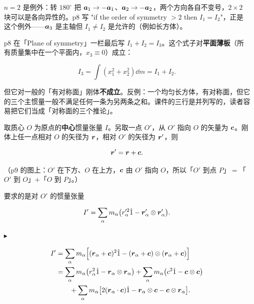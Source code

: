 \documentclass[11pt]{ctexart}
\newcommand{\step}[1]{\par\vspace{3pt}\noindent
  {\color{violet}\small$\blacktriangleright$}\hspace{3pt}{\bfseries\color{violetdeep}#1}\par\vspace{1pt}}
\begin{document}
$n=2$ 是例外：转 $180^\circ$ 把 $\boldsymbol{a}_1\to-\boldsymbol{a}_1$、$\boldsymbol{a}_2\to-\boldsymbol{a}_2$，两个方向各自不变号，$2\times2$ 块可以是各向异性的。p8 写 "if the order of symmetry $>2$ then $I_1=I_2$"，正是这个例外——$\boldsymbol{a}_3$ 是主轴但 $I_1\neq I_2$ 是允许的（例如长方体）。


p8 在「Plane of symmetry」一栏最后写 $I_1+I_2=I_3$。这个式子对\textbf{平面薄板}（所有质量集中在一个平面内，$x_3\equiv0$）成立：

\[
I_3=\int(x_1^2+x_2^2)\dd m=I_1+I_2 .
\]

但它对一般的「有对称面」刚体\textbf{不成立}。反例：一个均匀长方体，有对称面，但它的三个主惯量一般不满足任何一条为另两条之和。课件的三行是并列写的，读者容易把它们当成「对称面的三个推论」。




取质心 $O$ 为原点的\textbf{中心}惯量张量 $I$。另取一点 $O'$，从 $O'$ 指向 $O$ 的矢量为 $\boldsymbol{c}$。刚体上任一点相对 $O$ 的矢径为 $\boldsymbol{r}$，相对 $O'$ 的矢径为 $\boldsymbol{r}'$，则

\[
\boldsymbol{r}'=\boldsymbol{r}+\boldsymbol{c} .
\]

（p9 的图上：$O'$ 在下方、$O$ 在上方，$\boldsymbol{c}$ 由 $O'$ 指向 $O$，所以「$O'$ 到点 $P$」$=$「$O'$ 到 $O$」$+$「$O$ 到 $P$」。）

要求的是对 $O'$ 的惯量张量

\[
I'=\sum_\alpha m_\alpha\bigl(r_\alpha'^2\hat1-\boldsymbol{r}_\alpha'\otimes\boldsymbol{r}_\alpha'\bigr).
\]


\step{第一步：把 $\vect r'=\vect r+\vect c$ 代进去，逐项展开}
\[
\begin{aligned}
I'&=\sum_\alpha m_\alpha\Bigl[(\boldsymbol{r}_\alpha+\boldsymbol{c})^2\hat1-(\boldsymbol{r}_\alpha+\boldsymbol{c})\otimes(\boldsymbol{r}_\alpha+\boldsymbol{c})\Bigr]\\
&=\sum_\alpha m_\alpha\bigl(r_\alpha^2\hat1-\boldsymbol{r}_\alpha\otimes\boldsymbol{r}_\alpha\bigr)
+\sum_\alpha m_\alpha\bigl(c^2\hat1-\boldsymbol{c}\otimes\boldsymbol{c}\bigr)\\
&\qquad+\sum_\alpha m_\alpha\bigl[2(\boldsymbol{r}_\alpha\cdot\boldsymbol{c})\hat1-\boldsymbol{r}_\alpha\otimes\boldsymbol{c}-\boldsymbol{c}\otimes\boldsymbol{r}_\alpha\bigr].
\end{aligned}
\]
\end{document}
